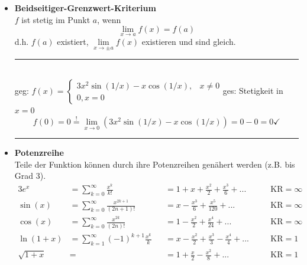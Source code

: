 \documentclass{article}
\newcommand{\lr}[1]{\left(#1\right)}
\newcommand{\comment}[1]{\textcolor{gruen}{\text{#1}}}
\begin{document}
\begin{itemize}
\begin{itemize}
		\item ''$\infty - \infty$''
			$$\lim\limits_{x\rightarrow 1^+} \lr{\frac{1}{1 - x} - \ln(x)} \stackrel{\comment{''$\infty - \infty$''}}{=} \lim\limits_{x\rightarrow 1^+} \frac{\ln(x) - (1 - x)}{(1 - x)\ln(x)} \stackrel{\comment{''$\frac{0}{0}$''}}{=} ...$$
	\end{itemize}


	\item \textbf{Beidseitiger-Grenzwert-Kriterium}\\
	$f$ ist stetig im Punkt $a$, wenn
		\begin{equation}
			\lim\limits_{x\rightarrow a}f(x) = f(a)
		\end{equation}
	d.h. $f(a)$ existiert, $\lim\limits_{x\rightarrow \pm a}f(x)$ existieren und sind gleich.

\vspace{0.5cm}

\begin{minipage}{\textwidth}
{\color{blue}
	\hrule
		\\
		geg: $f(x) = \begin{cases}3x^2\sin(1/x) - x\cos(1/x), & x\neq 0\\ 0, x = 0 \end{cases}$\quad ges: Stetigkeit in $x = 0$
			$$f(0) = 0 \stackrel{!}{=} \lim\limits_{x\rightarrow 0} \lr{3x^2\sin(1/x) - x\cos(1/x)} = 0 - 0 = 0 \checkmark$$
	\hrule
	}
\end{minipage}


	\item \textbf{Potenzreihe}\\
	Teile der Funktion können durch ihre Potenzreihen genähert werden (z.B. bis Grad 3).
		\begin{alignat}{3}
			e^x &= \sum_{k=0}^\infty \frac{x^k}{k!} &&= 1 + x + \frac{x^2}{2} + \frac{x^3}{6} + ... && \quad\text{KR} = \infty\\
			\sin(x) &= \sum_{k=0}^\infty \frac{x^{2k + 1}}{(2n + 1)!} &&= x - \frac{x^3}{6} + \frac{x^5}{120} + ... && \quad\text{KR} = \infty\\
			\cos(x) &= \sum_{k=0}^\infty \frac{x^{2k}}{(2n)!} &&= 1 - \frac{x^2}{2} + \frac{x^4}{24} + ... && \quad\text{KR} = \infty\\
			\ln(1 + x) &= \sum_{k=1}^\infty (-1)^{k + 1} \frac{x^k}{k} &&= x - \frac{x^2}{2} + \frac{x^3}{3} - \frac{x^4}{4} + ... && \quad\text{KR} = 1\\
			\sqrt{1 + x} &= &&= 1 + \frac{x}{2} - \frac{x^2}{8} + ... && \quad\text{KR} = 1
		\end{alignat}


\end{itemize}
\end{document}
